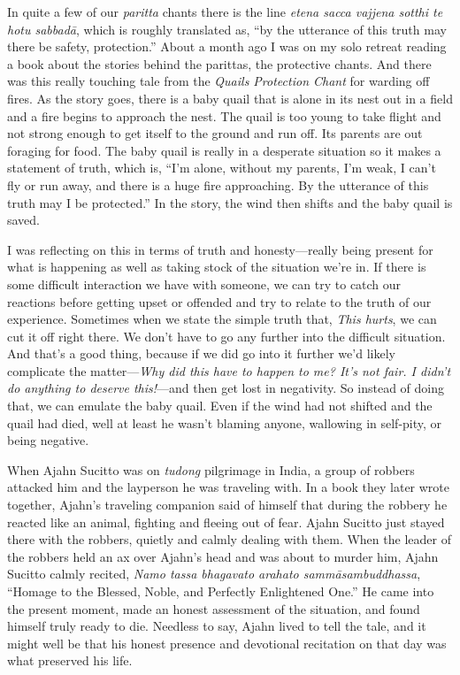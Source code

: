 
In quite a few of our \emph{paritta} chants there is the line 
\emph{etena sacca vajjena sotthi te hotu sabbadā}, which is roughly 
translated as, ``by the utterance of this truth may there be safety, 
protection.'' About a month ago I was on my solo retreat reading a book 
about the stories behind the parittas, the protective chants. And there 
was this really touching tale from the \emph{Quails Protection Chant} 
for warding off fires. As the story goes, there is a baby quail that is 
alone in its nest out in a field and a fire begins to approach the 
nest. The quail is too young to take flight and not strong enough to 
get itself to the ground and run off. Its parents are out foraging for 
food. The baby quail is really in a desperate situation so it makes a 
statement of truth, which is, ``I'm alone, without my parents, I'm 
weak, I can't fly or run away, and there is a huge fire approaching. By 
the utterance of this truth may I be protected.'' In the story, the 
wind then shifts and the baby quail is saved.

I was reflecting on this in terms of truth and honesty---really being 
present for what is happening as well as taking stock of the situation 
we're in. If there is some difficult interaction we have with someone, 
we can try to catch our reactions before getting upset or offended and 
try to relate to the truth of our experience. Sometimes when we state 
the simple truth that, \emph{This hurts}, we can cut it off right 
there. We don't have to go any further into the difficult situation. 
And that's a good thing, because if we did go into it further we'd 
likely complicate the matter---\emph{Why did this have to happen to me? 
It's not fair. I didn't do anything to deserve this!}---and then get 
lost in negativity. So instead of doing that, we can emulate the baby 
quail. Even if the wind had not shifted and the quail had died, well at 
least he wasn't blaming anyone, wallowing in self-pity, or being 
negative.

When Ajahn Sucitto was on \emph{tudong} pilgrimage in India, a group of 
robbers attacked him and the layperson he was traveling with. In a book 
they later wrote together, Ajahn's traveling companion said of himself 
that during the robbery he reacted like an animal, fighting and fleeing 
out of fear. Ajahn Sucitto just stayed there with the robbers, quietly 
and calmly dealing with them. When the leader of the robbers held an ax 
over Ajahn's head and was about to murder him, Ajahn Sucitto calmly 
recited, \emph{Namo tassa bhagavato arahato sammāsambuddhassa}, 
``Homage to the Blessed, Noble, and Perfectly Enlightened One.'' He 
came into the present moment, made an honest assessment of the 
situation, and found himself truly ready to die. Needless to say, Ajahn 
lived to tell the tale, and it might well be that his honest presence 
and devotional recitation on that day was what preserved his life.

